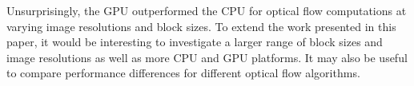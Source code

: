 \documentclass[12pt,letterpaper]{article}
\begin{document}
Unsurprisingly, the GPU outperformed the CPU for optical flow computations at
varying image resolutions and block sizes. To extend the work presented in this
paper, it would be interesting to investigate a larger range of block sizes and
image resolutions as well as more CPU and GPU platforms. It may also be useful
to compare performance differences for different optical flow algorithms. 

\nocite{*}


\end{document}
